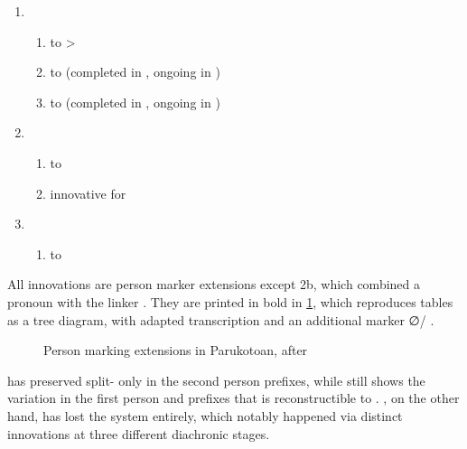 \begin{enumerate}
	\item \PPar \begin{enumerate}
		\item {}  to >
		\item {}  to  (completed in \PWai, ongoing in \kaxui)
		\item {}  to  (completed in \PWai, ongoing in \kaxui)
	\end{enumerate}
	\item \PWai \begin{enumerate}
		\item {}  to 
		\item innovative   for 
	\end{enumerate}
	\item \waiwai \begin{enumerate}
		\item {}  to \end{enumerate}
\end{enumerate}
%
All innovations are person marker extensions except 2b, which combined a pronoun with the linker .
They are printed in bold in \cref{fig:par_ext}, which reproduces  tables as a tree diagram, with adapted transcription and an additional \kaxui {} marker ∅/ .
%
\begin{figure}[hbt]
	\centering
	\setlength{\tabcolsep}{2pt}
	\caption{Person marking extensions in Parukotoan, after \textcite[94]{gildea1998}}
	\label{fig:par_ext}
\end{figure}
%
\hixka has preserved split- only in the second person prefixes, while \kaxui still shows the variation in the first person and  prefixes that is reconstructible to \PPar.
\waiwai, on the other hand, has lost the system entirely, which notably happened via distinct innovations at three different diachronic stages.


